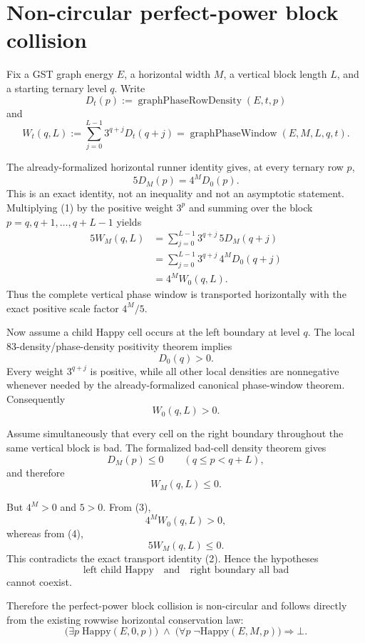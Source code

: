 \section*{Non-circular perfect-power block collision}

Fix a GST graph energy $E$, a horizontal width $M$, a vertical block length $L$, and a starting ternary level $q$.  Write
\[
D_t(p):=\operatorname{graphPhaseRowDensity}(E,t,p)
\]
and
\[
W_t(q,L):=\sum_{j=0}^{L-1}3^{q+j}D_t(q+j)
=\operatorname{graphPhaseWindow}(E,M,L,q,t).
\]

The already-formalized horizontal runner identity gives, at every ternary row $p$,
\[
5D_M(p)=4^M D_0(p).
\tag{1}
\]
This is an exact identity, not an inequality and not an asymptotic statement.
Multiplying (1) by the positive weight $3^p$ and summing over the block
$p=q,q+1,\ldots,q+L-1$ yields
\[
\begin{aligned}
5W_M(q,L)
&=\sum_{j=0}^{L-1}3^{q+j}\,5D_M(q+j)\\
&=\sum_{j=0}^{L-1}3^{q+j}\,4^M D_0(q+j)\\
&=4^M W_0(q,L).
\end{aligned}
\tag{2}
\]
Thus the complete vertical phase window is transported horizontally with the exact positive scale factor $4^M/5$.

Now assume a child Happy cell occurs at the left boundary at level $q$.  The local 83-density/phase-density positivity theorem implies
\[
D_0(q)>0.
\]
Every weight $3^{q+j}$ is positive, while all other local densities are nonnegative whenever needed by the already-formalized canonical phase-window theorem.  Consequently
\[
W_0(q,L)>0.
\tag{3}
\]

Assume simultaneously that every cell on the right boundary throughout the same vertical block is bad.  The formalized bad-cell density theorem gives
\[
D_M(p)\le 0
\qquad(q\le p<q+L),
\]
and therefore
\[
W_M(q,L)\le0.
\tag{4}
\]

But $4^M>0$ and $5>0$.  From (3),
\[
4^M W_0(q,L)>0,
\]
whereas from (4),
\[
5W_M(q,L)\le0.
\]
This contradicts the exact transport identity (2).  Hence the hypotheses
\[
\text{left child Happy}\quad\text{and}\quad\text{right boundary all bad}
\]
cannot coexist.

Therefore the perfect-power block collision is non-circular and follows directly from the existing rowwise horizontal conservation law:
\[
\boxed{
\bigl(\exists p\;\mathrm{Happy}(E,0,p)\bigr)
\;\wedge\;
\bigl(\forall p\;\neg\mathrm{Happy}(E,M,p)\bigr)
\Longrightarrow\bot.
}
\]

